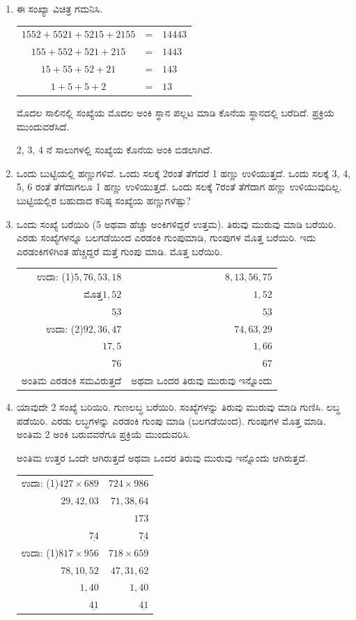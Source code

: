 \begin{enumerate}
\item ಈ ಸಂಖ್ಯಾ ವಿಚಿತ್ರ ಗಮನಿಸಿ. 

\begin{tabular}[t]{c@{\;}c@{\;}l}
$1552+5521+5215+2155$ & = & $14443$\\
$155+552+521+215$ & = & $1443$\\
$15+55+52+21$ & = & $143$\\
$1+5+5+2$ & = & $13$ 
\end{tabular}

\vskip 0.1cm

ಮೊದಲ ಸಾಲಿನಲ್ಲಿ ಸಂಖ್ಯೆಯ ಮೊದಲ ಅಂಕಿ ಸ್ಥಾನ ಪಲ್ಲಟ ಮಾಡಿ ಕೊನೆಯ ಸ್ಥಾನದಲ್ಲಿ ಬರೆದಿದೆ. ಪ್ರಕ್ರಿಯೆ ಮುಂದುವರೆಸಿದೆ. 

2, 3, 4 ನೆ ಸಾಲುಗಳಲ್ಲಿ ಸಂಖ್ಯೆಯ ಕೊನೆಯ ಅಂಕಿ ಬಿಡಲಾಗಿದೆ. 

\item ಒಂದು ಬುಟ್ಟಿಯಲ್ಲಿ ಹಣ್ಣುಗಳಿವೆ. ಒಂದು ಸಲಕ್ಕೆ 2ರಂತೆ ತೆಗೆದರೆ 1 ಹಣ್ಣು ಉಳಿಯುತ್ತದೆ. ಒಂದು ಸಲಕ್ಕೆ 3, 4, 5, 6 ರಂತೆ ತೆಗೆದಾಗಲೂ 1 ಹಣ್ಣು ಉಳಿಯುತ್ತದೆ. ಒಂದು ಸಲಕ್ಕೆ 7ರಂತೆ ತೆಗೆದಾಗ ಹಣ್ಣು ಉಳಿಯುವುದಿಲ್ಲ. ಬುಟ್ಟಿಯಲ್ಲಿರ ಬಹುದಾದ ಕನಿಷ್ಠ ಸಂಖ್ಯೆಯ ಹಣ್ಣುಗಳೆಷ್ಟು? 

\item ಒಂದು ಸಂಖ್ಯೆ ಬರೆಯಿರಿ (5 ಅಥವಾ ಹೆಚ್ಚು ಅಂಕಿಗಳಿದ್ದರೆ ಉತ್ತಮ). ತಿರುವು ಮುರುವು ಮಾಡಿ ಬರೆಯಿರಿ. ಎರಡು ಸಂಖ್ಯೆಗಳನ್ನೂ ಬಲಗಡೆಯಿಂದ ಎರಡಂಕಿ ಗುಂಪುಮಾಡಿ, ಗುಂಪುಗಳ ಮೊತ್ತ ಬರೆಯಿರಿ. ಇದು ಎರಡಂಕಿಗಳಿಗಿಂತ ಹೆಚ್ಚಿದ್ದರೆ ಮತ್ತೆ ಗುಂಪು ಮಾಡಿ. ಮೊತ್ತ ಬರೆಯಿರಿ. 

{\fontsize{12pt}{14pt}\selectfont
\begin{tabular}[t]{rr}
ಉದಾ: (1)\quad  $5,76,53,18$ & $8,13,56,75$\\
ಮೊತ್ತ\quad $1,52$ & $1,52$\\
$\underline{53}$ & $\underline{53}$\\
ಉದಾ: (2)\quad $92,36,47$  & $74,63,29$\\
$17,5$ & $1,66$\\
$76$ & $67$\\
ಅಂತಿಮ ಎರಡಂಕಿ ಸಮವಿರುತ್ತದೆ  & ಅಥವಾ ಒಂದರ ತಿರುವು ಮುರುವು ಇನ್ನೊಂದು 
\end{tabular}}\relax

\eject

\item ಯಾವುದೇ 2 ಸಂಖ್ಯೆ ಬರಿಯಿರಿ. ಗುಣಲಬ್ಧ ಬರೆಯಿರಿ. ಸಂಖ್ಯೆಗಳನ್ನು ತಿರುವು ಮುರುವು ಮಾಡಿ ಗುಣಿಸಿ. ಲಬ್ಧ ಪಡೆಯಿರಿ. ಎರಡು ಲಬ್ಧಗಳನ್ನು ಎರಡಂಕಿ ಗುಂಪು ಮಾಡಿ (ಬಲಗಡೆಯಿಂದ). ಗುಂಪುಗಳ ಮೊತ್ತ ಮಾಡಿ. ಅಂತಿಮ 2 ಅಂಕಿ ಬರುವವರೆಗೂ ಪ್ರಕ್ರಿಯೆ ಮುಂದುವರಿಸಿ. 

ಅಂತಿಮ ಉತ್ತರ ಒಂದೇ ಆಗಿರುತ್ತದೆ ಅಥವಾ ಒಂದರ ತಿರುವು ಮುರುವು ಇನ್ನೊಂದು ಆಗಿರುತ್ತದೆ. 

\begin{tabular}[t]{rr}
ಉದಾ: (1)\quad $427\times 689$ & $724\times 986$\\
$29,42,03$ & $71,38,64$\\
& $173$\\
$\underline{74}$ & $\underline{74}$\\
ಉದಾ: (1)\quad $817\times 956$ & $718\times 659$\\
$78,10,52$ & $47,31,62$\\
$1,40$ & $1,40$\\
$\underline{41}$ & $\underline{41}$
\end{tabular}
\end{enumerate}


